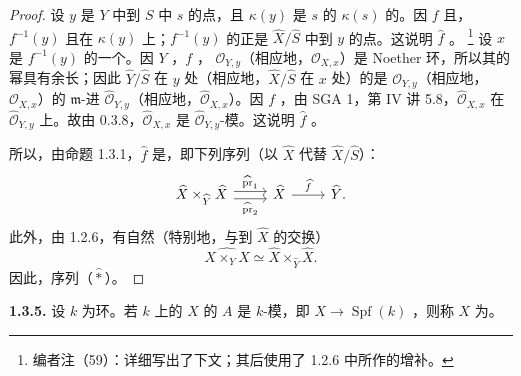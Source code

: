 \begin{proof}
设 $y$ 是 $Y$ 中到 $S$ 中 $s$ 的点，且 $\kappa(y)$ 是 $s$ 的 $\kappa(s)$ 的。因 $f$ 且，$f^{-1}(y)$ 且在 $\kappa(y)$ 上；$f^{-1}(y)$ 的正是 $\widehat X/\widehat S$ 中到 $y$ 的点。这说明 $\widehat f$ 。
\footnote{编者注（59）：详细写出了下文；其后使用了 1.2.6 中所作的增补。} 设 $x$ 是 $f^{-1}(y)$ 的一个。因 $Y$ ，$f$ ， $\mathcal O_{Y,y}$（相应地，$\mathcal O_{X,x}$）是 Noether 环，所以其的幂具有余长；因此 $\widehat Y/\widehat S$ 在 $y$ 处（相应地，$\widehat X/\widehat S$ 在 $x$ 处）的是 $\mathcal O_{Y,y}$（相应地，$\mathcal O_{X,x}$）的 $\mathfrak m$-进 $\widehat{\mathcal O}_{Y,y}$（相应地，$\widehat{\mathcal O}_{X,x}$）。因 $f$ ，由 SGA 1，第 IV 讲 5.8，$\widehat{\mathcal O}_{X,x}$ 在 $\widehat{\mathcal O}_{Y,y}$ 上。故由 0.3.8，$\widehat{\mathcal O}_{X,x}$ 是 $\widehat{\mathcal O}_{Y,y}$-模。这说明 $\widehat f$ 。

所以，由命题 1.3.1，$\widehat f$ 是，即下列序列（以 $\widehat X$ 代替 $\widehat X/\widehat S$）：
\[
\begin{tikzcd}
 \widehat X\times_{\widehat Y}\widehat X\arrow[r,shift left=.6ex,"\widehat{\operatorname{pr}}_1"]\arrow[r,shift right=.6ex,"\widehat{\operatorname{pr}}_2"']&\widehat X\arrow[r,"\widehat f"]&\widehat Y.
\end{tikzcd}
\]
此外，由 1.2.6，有自然（特别地，与到 $\widehat X$ 的交换）
\[
 \widehat{X\times_Y X}\simeq\widehat X\times_{\widehat Y}\widehat X.
\]
因此，序列（$\widehat *$）。
\end{proof}

\textbf{1.3.5.} 设 $k$ 为环。若 $k$ 上的 $X$ 的 $A$ 是 $k$-模，即 $X\to\operatorname{Spf}(k)$ ，则称 $X$ 为。

